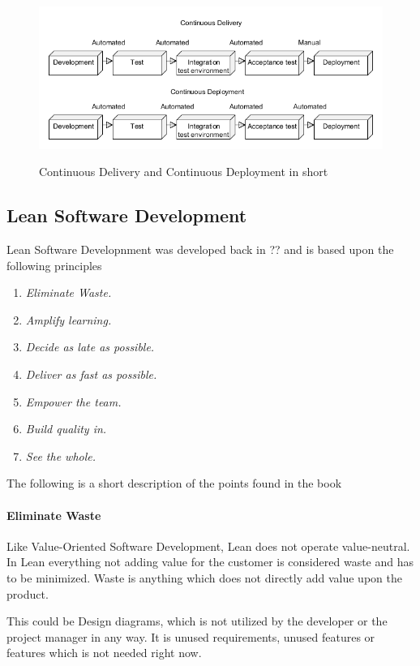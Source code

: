 \documentclass{sig-alternate}
\begin{document}
\begin{figure}
\caption{Continuous Delivery and Continuous Deployment in short}
\includegraphics[scale=0.37]{Umlet/DeliveryandDeployment}
\label{fig:deliverydeploment}
\end{figure}


\subsection{Lean Software Development}
\label{lean}
Lean Software Developnment\cite{poppendieck:lean} was developed back in ?? and is based upon the following principles

\begin{enumerate}
\item \textit{Eliminate Waste.}
\item \textit{Amplify learning.} 
\item \textit{Decide as late as possible.}
\item \textit{Deliver as fast as possible.}
\item \textit{Empower the team.}
\item \textit{Build quality in.} 
\item \textit{See the whole.} 
\end{enumerate}

The following is a short description of the points found in the book \cite{poppendieck:lean}

\paragraph{Eliminate Waste}
Like Value-Oriented Software Development, Lean does not operate value-neutral. 
In Lean everything not adding value for the customer is considered waste and has to be minimized.
Waste is anything which does not directly add value upon the product. 

This could be Design diagrams, which is not utilized by the developer or the project manager in any way. 
It is unused requirements, unused features or features which is not needed right now.
\end{document}
